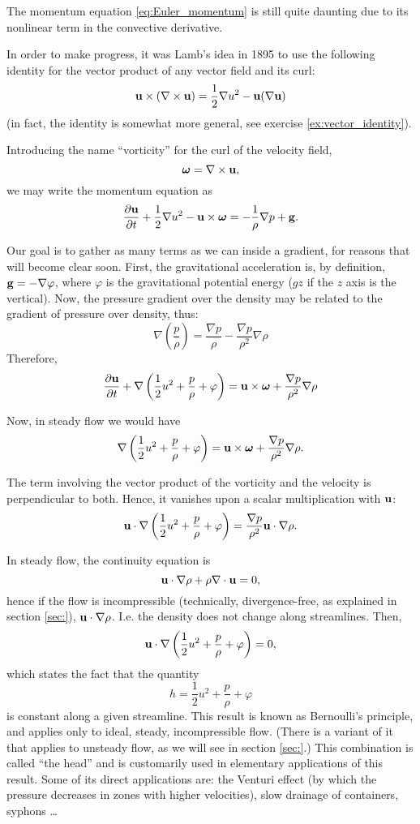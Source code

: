 The momentum equation \ref{eq:Euler_momentum} is still quite daunting
due to its nonlinear term in the convective derivative.

In order to make progress, it was Lamb's idea in 1895 to use the
following identity for the vector product of any vector field and its
curl:
\[
\mathbf{u} \times ( \nabla\times \mathbf{u}) =
\frac12 \nabla u^2 - \mathbf{u} (\nabla \mathbf{u} )
\]
(in fact, the identity is somewhat more general, see exercise
\ref{ex:vector_identity}).

Introducing the name ``vorticity'' for the curl of the velocity field,
\[
\bm{\omega} = \nabla\times\mathbf{u} ,
\]
we may write the momentum equation as
\[
\frac{\partial \mathbf{u} }{\partial t} +
\frac12 \nabla u^2 - \mathbf{u} \times\bm{\omega} =
  - \frac{1}{\rho} \nabla p 
  + \mathbf{g} .
\]

Our goal is to gather as many terms as we can inside a gradient, for
reasons that will become clear soon. First, the gravitational
acceleration is, by definition, $\mathbf{g} = -\nabla\varphi$, where
$\varphi $ is the gravitational potential energy ($g z$ if the $z$
axis is the vertical). Now, the pressure gradient over the density may
be related to the gradient of pressure over density, thus:
\[
\nabla
\left(
\frac{p}{\rho}
\right) =
\frac{ \nabla p }{\rho} -
\frac{ \nabla p }{\rho^2} \nabla \rho 
\]
Therefore,
\[
\frac{\partial \mathbf{u} }{\partial t} +
 \nabla
\left(
\frac12 u^2 +
\frac{p}{\rho} +
\varphi
\right)
=
  \mathbf{u} \times\bm{\omega} +
 \frac{ \nabla p }{\rho^2} \nabla \rho 
\]

Now, in steady flow we would have
\[
\nabla
\left(
\frac12 u^2 +
\frac{p}{\rho} +
\varphi
\right)
=
  \mathbf{u} \times\bm{\omega} +
 \frac{ \nabla p }{\rho^2} \nabla \rho  .
\]

The term involving the vector product of the vorticity and the
velocity is perpendicular to both. Hence, it vanishes upon a scalar
multiplication with $\mathbf{u}$:
\[
\mathbf{u}\cdot
\nabla
\left(
\frac12 u^2 +
\frac{p}{\rho} +
\varphi
\right)
=
\frac{ \nabla p }{\rho^2} \mathbf{u}\cdot \nabla \rho  .
\]
 
In steady flow, the continuity equation is
\[
\mathbf{u}\cdot \nabla \rho  +
\rho \nabla \cdot \mathbf{u} = 0 ,
\]
hence if the flow is incompressible (technically, divergence-free, as
explained in section \ref{sec:}), $\mathbf{u}\cdot \nabla \rho $. I.e. the
density does not change along streamlines. Then,
\[
\mathbf{u}\cdot
\nabla
\left(
\frac12 u^2 +
\frac{p}{\rho} +
\varphi
\right)
=
0 ,
\]
which states the fact that the quantity
\[
h = \frac12 u^2 + \frac{p}{\rho} + \varphi
\]
is constant along a given streamline. This result is known as
Bernoulli's principle, and applies only to ideal, steady,
incompressible flow. (There is a variant of it that applies to
unsteady flow, as we will see in section \ref{sec:}.)
%
This combination is called ``the head'' and is customarily used in
elementary applications of this result. Some of its direct
applications are: the Venturi effect (by which the pressure decreases
in zones with higher velocities), slow drainage of containers, syphons
\ldots

